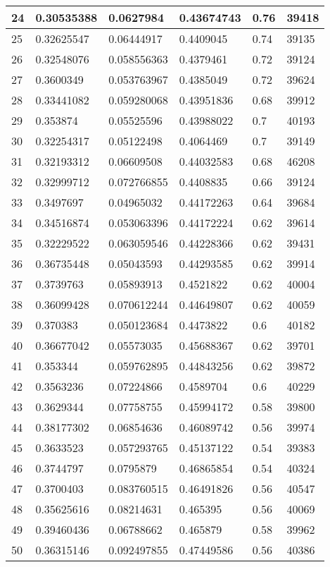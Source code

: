 \begin{longtable}{|l|l|l|l|l|l|}
24 & 0.30535388 & 0.0627984 & 0.43674743 & 0.76 & 39418 \\ \hline 
25 & 0.32625547 & 0.06444917 & 0.4409045 & 0.74 & 39135 \\ \hline 
26 & 0.32548076 & 0.058556363 & 0.4379461 & 0.72 & 39124 \\ \hline 
27 & 0.3600349 & 0.053763967 & 0.4385049 & 0.72 & 39624 \\ \hline 
28 & 0.33441082 & 0.059280068 & 0.43951836 & 0.68 & 39912 \\ \hline 
29 & 0.353874 & 0.05525596 & 0.43988022 & 0.7 & 40193 \\ \hline 
30 & 0.32254317 & 0.05122498 & 0.4064469 & 0.7 & 39149 \\ \hline 
31 & 0.32193312 & 0.06609508 & 0.44032583 & 0.68 & 46208 \\ \hline 
32 & 0.32999712 & 0.072766855 & 0.4408835 & 0.66 & 39124 \\ \hline 
33 & 0.3497697 & 0.04965032 & 0.44172263 & 0.64 & 39684 \\ \hline 
34 & 0.34516874 & 0.053063396 & 0.44172224 & 0.62 & 39614 \\ \hline 
35 & 0.32229522 & 0.063059546 & 0.44228366 & 0.62 & 39431 \\ \hline 
36 & 0.36735448 & 0.05043593 & 0.44293585 & 0.62 & 39914 \\ \hline 
37 & 0.3739763 & 0.05893913 & 0.4521822 & 0.62 & 40004 \\ \hline 
38 & 0.36099428 & 0.070612244 & 0.44649807 & 0.62 & 40059 \\ \hline 
39 & 0.370383 & 0.050123684 & 0.4473822 & 0.6 & 40182 \\ \hline 
40 & 0.36677042 & 0.05573035 & 0.45688367 & 0.62 & 39701 \\ \hline 
41 & 0.353344 & 0.059762895 & 0.44843256 & 0.62 & 39872 \\ \hline 
42 & 0.3563236 & 0.07224866 & 0.4589704 & 0.6 & 40229 \\ \hline 
43 & 0.3629344 & 0.07758755 & 0.45994172 & 0.58 & 39800 \\ \hline 
44 & 0.38177302 & 0.06854636 & 0.46089742 & 0.56 & 39974 \\ \hline 
45 & 0.3633523 & 0.057293765 & 0.45137122 & 0.54 & 39383 \\ \hline 
46 & 0.3744797 & 0.0795879 & 0.46865854 & 0.54 & 40324 \\ \hline 
47 & 0.3700403 & 0.083760515 & 0.46491826 & 0.56 & 40547 \\ \hline 
48 & 0.35625616 & 0.08214631 & 0.465395 & 0.56 & 40069 \\ \hline 
49 & 0.39460436 & 0.06788662 & 0.465879 & 0.58 & 39962 \\ \hline 
50 & 0.36315146 & 0.092497855 & 0.47449586 & 0.56 & 40386 \\ \hline 
\end{longtable}